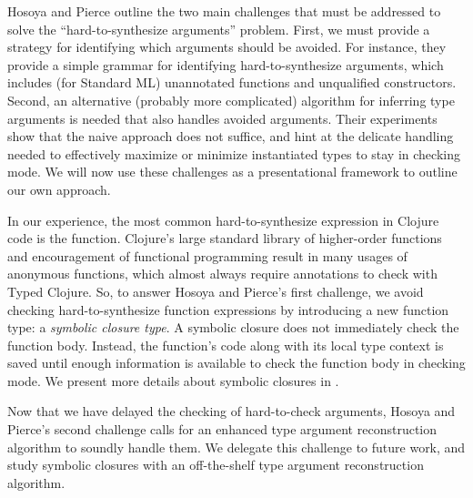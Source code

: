 Hosoya and Pierce outline the two main challenges that must be
addressed to solve the ``hard-to-synthesize arguments'' problem.
First, we must provide a strategy for identifying which arguments 
should be avoided.
For instance,
they provide a simple grammar for identifying hard-to-synthesize arguments,
which includes (for Standard ML) unannotated functions and unqualified constructors.
Second, an alternative (probably more complicated) algorithm
for inferring type arguments is needed that also handles
avoided arguments.
Their experiments show that the naive approach does not suffice,
and hint at the delicate handling needed to effectively maximize or minimize
instantiated types to stay in checking mode.
We will now use these challenges as a presentational framework to outline our own approach.

In our experience, the most common hard-to-synthesize expression in Clojure code
is the function.
Clojure's large standard library of higher-order functions and encouragement
of functional programming result in many usages of anonymous functions, which almost
always require annotations to check with Typed Clojure.
So, to answer Hosoya and Pierce's first challenge, 
we avoid checking hard-to-synthesize function expressions by
introducing a new function type: a \emph{symbolic closure type}.
A symbolic closure does not immediately check the function body. Instead,
the function's code along with its local type context is saved
until enough information is available to check
the function body in checking mode.
We present more details about symbolic closures in .

Now that we have delayed the checking of hard-to-check arguments,
Hosoya and Pierce's second challenge calls for an enhanced
type argument reconstruction algorithm to soundly handle
them.
We delegate this challenge to future work, and study symbolic closures
with an off-the-shelf
type argument reconstruction algorithm.

